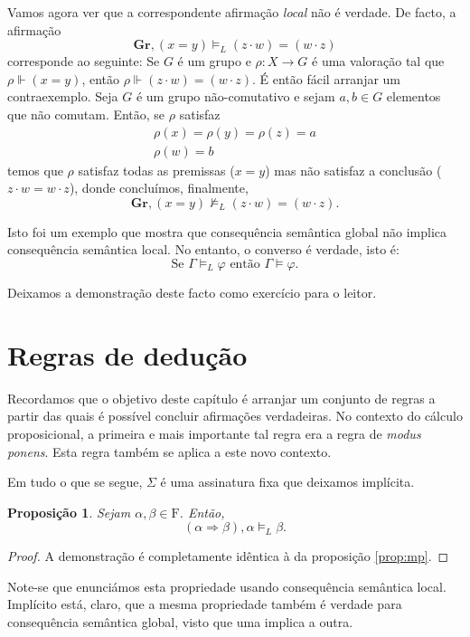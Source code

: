 \documentclass{report}
\newtheorem{prop}{Proposição}
\theoremstyle{definition}
\theoremstyle{remark}
\newcommand{\F}{\mathrm{F}}
\newcommand{\imply}{\mathbin{\Rightarrow}}
\begin{document}
	Vamos agora ver que a correspondente afirmação \emph{local} não é verdade. De facto, a afirmação
	\[\mathbf{Gr}, (x = y) \vDash_L (z \cdot w) = (w \cdot z)\]
	corresponde ao seguinte: Se $G$ é um grupo e $\rho : X \to G$ é uma valoração tal que $\rho \Vdash (x = y)$, então $\rho \Vdash (z \cdot w) = (w \cdot z)$. É então fácil arranjar um contraexemplo. Seja $G$ é um grupo não-comutativo e sejam $a, b \in G$ elementos que não comutam. Então, se $\rho$ satisfaz
	\begin{gather*}
	\rho(x) = \rho(y) = \rho(z) = a\\
	\rho(w) = b
	\end{gather*}
	temos que $\rho$ satisfaz todas as premissas ($x = y$) mas não satisfaz a conclusão ($z\cdot w = w\cdot z$), donde concluímos, finalmente,
	\[\mathbf{Gr}, (x = y) \nvDash_L (z \cdot w) = (w \cdot z).\]
	
	Isto foi um exemplo que mostra que consequência semântica global não implica consequência semântica local. No entanto, o converso é verdade, isto é:
	\[\text{Se } \Gamma \vDash_L \varphi \text{ então } \Gamma \vDash \varphi.\]
	
	Deixamos a demonstração deste facto como exercício para o leitor.
	
	\section{Regras de dedução}
	
	Recordamos que o objetivo deste capítulo é arranjar um conjunto de regras a partir das quais é possível concluir afirmações verdadeiras. No contexto do cálculo proposicional, a primeira e mais importante tal regra era a regra de \textit{modus ponens}. Esta regra também se aplica a este novo contexto.
	
	Em tudo o que se segue, $\Sigma$ é uma assinatura fixa que deixamos implícita.
	
	\begin{prop}
	Sejam $\alpha, \beta \in \F$. Então,
	\[(\alpha \imply \beta), \alpha \vDash_L \beta.\]
	\end{prop}
	
	\begin{proof}
	A demonstração é completamente idêntica à da proposição \ref{prop:mp}.
	\end{proof}
	
	Note-se que enunciámos esta propriedade usando consequência semântica local. Implícito está, claro, que a mesma propriedade também é verdade para consequência semântica global, visto que uma implica a outra.
	
\end{document}
